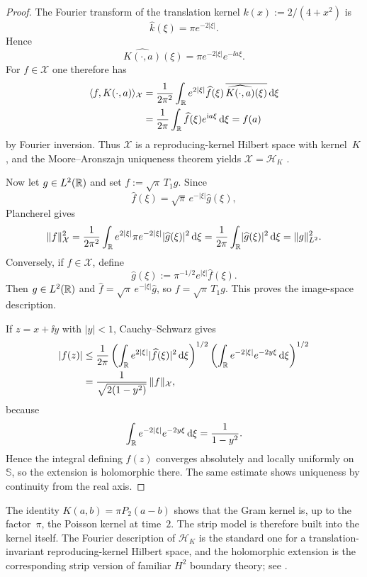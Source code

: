 \begin{proof}
The Fourier transform of the translation kernel $k(x):=2/(4+x^2)$ is
\[
\widehat k(\xi)=\pi e^{-2|\xi|}.
\]
Hence
\[
\widehat{K(\cdot,a)}(\xi)=\pi e^{-2|\xi|}e^{-\ii a\xi}.
\]
For $f\in\mathcal X$ one therefore has
\begin{align*}
\langle f,K(\cdot,a)\rangle_{\mathcal X}
&=
\frac{1}{2\pi^2}\int_{\mathbb{R}}
e^{2|\xi|}\widehat f(\xi)\,
\overline{\widehat{K(\cdot,a)}(\xi)}\,\mathrm{d}\xi \\
&=
\frac{1}{2\pi}\int_{\mathbb{R}}\widehat f(\xi)e^{\mathrm{i} a\xi}\,\mathrm{d}\xi
=f(a)
\end{align*}
by Fourier inversion.  Thus $\mathcal X$ is a reproducing-kernel Hilbert
space with kernel~$K$, and the Moore--Aronszajn uniqueness theorem yields
$\mathcal X=\mathcal H_K$ \cite{Aronszajn1950}.

Now let $g\in L^2(\mathbb{R})$ and set $f:=\sqrt{\pi}\,T_1 g$.  Since
\[
\widehat f(\xi)=\sqrt{\pi}\,e^{-|\xi|}\widehat g(\xi),
\]
Plancherel gives
\[
\|f\|_{\mathcal X}^2
=\frac{1}{2\pi^2}\int_{\mathbb{R}}e^{2|\xi|}\pi e^{-2|\xi|}
\lvert \widehat g(\xi)\rvert^2\,\mathrm{d}\xi
=\frac{1}{2\pi}\int_{\mathbb{R}}\lvert \widehat g(\xi)\rvert^2\,\mathrm{d}\xi
=\|g\|_{L^2}^2.
\]
Conversely, if $f\in\mathcal X$, define
\[
\widehat g(\xi):=\pi^{-1/2}e^{|\xi|}\widehat f(\xi).
\]
Then $g\in L^2(\mathbb{R})$ and
$\widehat f=\sqrt{\pi}\,e^{-|\xi|}\widehat g$, so
$f=\sqrt{\pi}\,T_1 g$.  This proves the image-space description.

If $z=x+\ii y$ with $|y|<1$, Cauchy--Schwarz gives
\begin{align*}
|f(z)|
&\le \frac{1}{2\pi}
\left(\int_{\mathbb{R}}e^{2|\xi|}\lvert \widehat f(\xi)\rvert^2\,\mathrm{d}\xi\right)^{1/2}
\left(\int_{\mathbb{R}}e^{-2|\xi|}e^{-2y\xi}\,\mathrm{d}\xi\right)^{1/2} \\
&=
\frac{1}{\sqrt{2(1-y^2)}}\,\|f\|_{\mathcal X},
\end{align*}
because
\[
\int_{\mathbb{R}}e^{-2|\xi|}e^{-2y\xi}\,\mathrm{d}\xi=\frac{1}{1-y^2}.
\]
Hence the integral defining $f(z)$ converges absolutely and locally
uniformly on $\mathbb S$, so the extension is holomorphic there.  The same
estimate shows uniqueness by continuity from the real axis.
\end{proof}

\begin{remark}\label{rem:poisson-image-framework}
The identity $K(a,b)=\pi P_2(a-b)$ shows that the Gram kernel is, up to
the factor~$\pi$, the Poisson kernel at time~$2$.  The strip model is
therefore built into the kernel itself.  The Fourier description of
$\mathcal H_K$ is the standard one for a translation-invariant
reproducing-kernel Hilbert space, and the holomorphic extension is the
corresponding strip version of familiar $H^2$ boundary theory; see
\cite{Aronszajn1950,Duren1970,Rudin1987}.
\end{remark}

